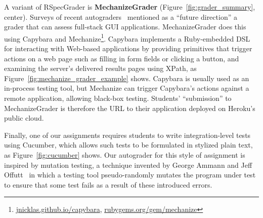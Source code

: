 A variant of RSpecGrader is \textbf{MechanizeGrader}  (Figure~\ref{fig:grader_summary}, center).
Surveys of recent
autograders~\cite{ihantola-2010-autograding-survey,douce-2005-autograding-survey}
mentioned as a ``future direction'' a grader that can assess full-stack
GUI applications.
MechanizeGrader does this using Capybara and
Mechanize\footnote{\url{jnicklas.github.io/capybara},
\url{rubygems.org/gem/mechanize}}.
Capybara implements a Ruby-embedded DSL for interacting with Web-based
applications by providing primitives that trigger actions on a web page
such as filling in form fields or clicking a button, and examining the
server's delivered results pages using XPath, as
Figure~\ref{fig:mechanize_grader_example} shows. 
Capybara is usually used as an in-process testing tool, but Mechanize
can trigger Capybara's actions against a remote application, allowing
black-box testing.
Students' ``submission'' to MechanizeGrader is therefore the URL to their
application deployed on Heroku's public 
cloud.

Finally, one of our assignments requires students to write integration-level
tests using Cucumber, which allows such tests to be formulated in
stylized plain text, as Figure~\ref{fig:cucumber} shows.
Our autograder for this
style of assignment is inspired by mutation testing, a technique invented
by George Ammann and Jeff 
Offutt~\cite{ammann-offutt-sw-testing} in which a
testing tool pseudo-randomly mutates the program under test to ensure
that some test fails as a result of these introduced errors.


